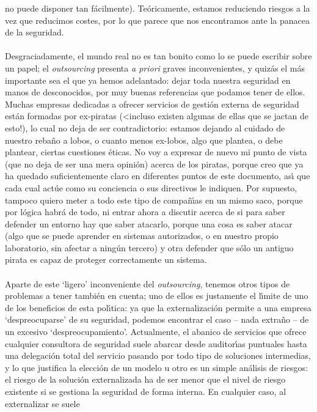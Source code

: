 no puede disponer tan f\'acilmente). Te\'oricamente, estamos reduciendo riesgos
a la vez que reducimos costes, por lo que parece que nos encontramos ante la
panacea de la seguridad.\\
\\Desgraciadamente, el mundo real no es tan bonito como lo se puede escribir 
sobre un papel; el {\it outsourcing} presenta {\it a priori} graves 
inconvenientes, y quiz\'as el m\'as importante sea el que ya hemos adelantado:
dejar toda nuestra seguridad en manos de desconocidos, por muy buenas 
referencias que podamos tener de ellos. Muchas empresas dedicadas a ofrecer
servicios de gesti\'on externa de seguridad est\'an formadas por ex-piratas
(<incluso existen algunas de ellas que se jactan de esto!), lo cual no deja de
ser contradictorio: estamos dejando al cuidado de nuestro reba\~no a lobos, o
cuanto menos ex-lobos, algo que plantea, o debe plantear, ciertas 
cuestiones \'eticas. No voy a expresar de nuevo mi punto de vista (que no deja
de ser una mera opini\'on) acerca de los piratas, porque creo que ya ha quedado 
suficientemente claro en diferentes puntos de este documento, as\'{\i} que cada
cual act\'ue como su conciencia o sus directivos le indiquen. Por supuesto, 
tampoco quiero meter a todo este tipo de compa\~n\'{\i}as en un mismo saco, 
porque por l\'ogica habr\'a de todo, ni entrar ahora a discutir acerca de si
para saber defender un entorno hay que saber atacarlo, porque una cosa es saber
atacar (algo que se puede aprender en sistemas autorizados, o en nuestro
propio laboratorio, sin afectar a ning\'un tercero) y otra defender que s\'olo
un antiguo pirata es capaz de proteger correctamente un sistema.\\
\\Aparte de este `ligero' inconveniente del {\it outsourcing}, tenemos otros
tipos de problemas a tener tambi\'en en cuenta; uno de ellos es justamente el
l\'{\i}mite de uno de los beneficios de esta pol\'{\i}tica: ya que la 
externalizaci\'on permite a una empresa `despreocuparse' de su seguridad, 
podemos encontrar el caso -- nada extra\~no -- de un excesivo 
`despreocupamiento'. Actualmente, el abanico de servicios que ofrece cualquier
consultora de seguridad suele abarcar desde auditor\'{\i}as puntuales hasta
una delegaci\'on total del servicio pasando por todo tipo de soluciones
intermedias, y lo que justifica la elecci\'on de un
modelo u otro es un simple an\'alisis de riesgos: el riesgo de la soluci\'on
externalizada ha de ser menor que el nivel de riesgo existente si se gestiona
la seguridad de forma interna. En cualquier caso, al externalizar se suele
